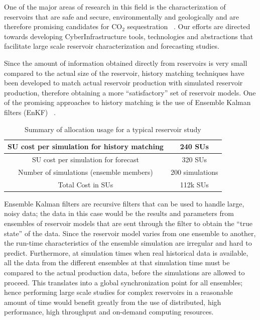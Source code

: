 \documentclass[a4paper,10pt]{article}
\begin{document}
One of the major areas of research in this field is the characterization of reservoirs that are safe and secure, environmentally and geologically and are therefore promising candidates for CO$_2$ sequestration ~\cite{GeoRPT,Luigi}. Our efforts are directed towards developing CyberInfrastructure tools, technologies and abstractions that facilitate large scale reservoir characterization and forecasting studies.

Since the amount of information obtained directly from reservoirs is very small compared to the actual size of the reservoir, history matching techniques have been developed to match actual reservoir production with simulated reservoir production, therefore obtaining a more ``satisfactory'' set of reservoir models. One of the promising approaches to history matching is the use of Ensemble Kalman filters (EnKF) ~\cite{KalmanPaper, DO2007, LiEnKF07, DO2006}.

\begin{table}[!h]
\begin{center}
 \caption{Summary of allocation usage for a typical reservoir study}
\begin{tabular}{| c | c |}
\hline
SU cost per simulation for history matching& 240 SUs \\ 
\hline
SU cost per simulation for forecast & 320 SUs \\ 
\hline
Number of simulations (ensemble members) & 200 simulations \\ 
\hline
Total Cost in SUs & 112k SUs\\
\hline
\end{tabular}
\end{center}
\end{table}

Ensemble Kalman filters are recursive filters that can be used to handle large, noisy data; the data in this case would be the results and parameters from ensembles of reservoir models that are sent through the filter to obtain the ``true state'' of the data. Since the reservoir model varies from one ensemble to another, the run-time characteristics of the ensemble simulation are irregular and hard to predict. Furthermore, at simulation times when real historical data is available, all the data from the different ensembles at that simulation time must be compared to the actual production data, before the simulations are allowed to proceed. This translates into a global synchronization point for all ensembles; hence performing large scale studies for complex reservoirs in a reasonable amount of time would benefit greatly from the use of distributed, high performance, high throughput and on-demand computing resources.
\end{document}

